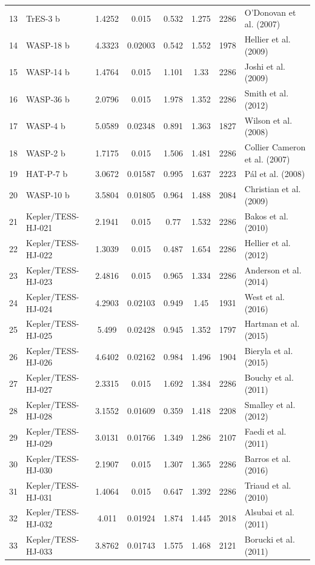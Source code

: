 \begin{longtable}{r l c c c c c p{4.2cm}}
13 & TrES-3 b & 1.4252 & 0.015 & 0.532 & 1.275 & 2286 & O'Donovan et al. (2007) \\
14 & WASP-18 b & 4.3323 & 0.02003 & 0.542 & 1.552 & 1978 & Hellier et al. (2009) \\
15 & WASP-14 b & 1.4764 & 0.015 & 1.101 & 1.33 & 2286 & Joshi et al. (2009) \\
16 & WASP-36 b & 2.0796 & 0.015 & 1.978 & 1.352 & 2286 & Smith et al. (2012) \\
17 & WASP-4 b & 5.0589 & 0.02348 & 0.891 & 1.363 & 1827 & Wilson et al. (2008) \\
18 & WASP-2 b & 1.7175 & 0.015 & 1.506 & 1.481 & 2286 & Collier Cameron et al. (2007) \\
19 & HAT-P-7 b & 3.0672 & 0.01587 & 0.995 & 1.637 & 2223 & Pál et al. (2008) \\
20 & WASP-10 b & 3.5804 & 0.01805 & 0.964 & 1.488 & 2084 & Christian et al. (2009) \\
21 & Kepler/TESS-HJ-021 & 2.1941 & 0.015 & 0.77 & 1.532 & 2286 & Bakos et al. (2010) \\
22 & Kepler/TESS-HJ-022 & 1.3039 & 0.015 & 0.487 & 1.654 & 2286 & Hellier et al. (2012) \\
23 & Kepler/TESS-HJ-023 & 2.4816 & 0.015 & 0.965 & 1.334 & 2286 & Anderson et al. (2014) \\
24 & Kepler/TESS-HJ-024 & 4.2903 & 0.02103 & 0.949 & 1.45 & 1931 & West et al. (2016) \\
25 & Kepler/TESS-HJ-025 & 5.499 & 0.02428 & 0.945 & 1.352 & 1797 & Hartman et al. (2015) \\
26 & Kepler/TESS-HJ-026 & 4.6402 & 0.02162 & 0.984 & 1.496 & 1904 & Bieryla et al. (2015) \\
27 & Kepler/TESS-HJ-027 & 2.3315 & 0.015 & 1.692 & 1.384 & 2286 & Bouchy et al. (2011) \\
28 & Kepler/TESS-HJ-028 & 3.1552 & 0.01609 & 0.359 & 1.418 & 2208 & Smalley et al. (2012) \\
29 & Kepler/TESS-HJ-029 & 3.0131 & 0.01766 & 1.349 & 1.286 & 2107 & Faedi et al. (2011) \\
30 & Kepler/TESS-HJ-030 & 2.1907 & 0.015 & 1.307 & 1.365 & 2286 & Barros et al. (2016) \\
31 & Kepler/TESS-HJ-031 & 1.4064 & 0.015 & 0.647 & 1.392 & 2286 & Triaud et al. (2010) \\
32 & Kepler/TESS-HJ-032 & 4.011 & 0.01924 & 1.874 & 1.445 & 2018 & Alsubai et al. (2011) \\
33 & Kepler/TESS-HJ-033 & 3.8762 & 0.01743 & 1.575 & 1.468 & 2121 & Borucki et al. (2011) \\

\end{longtable}
